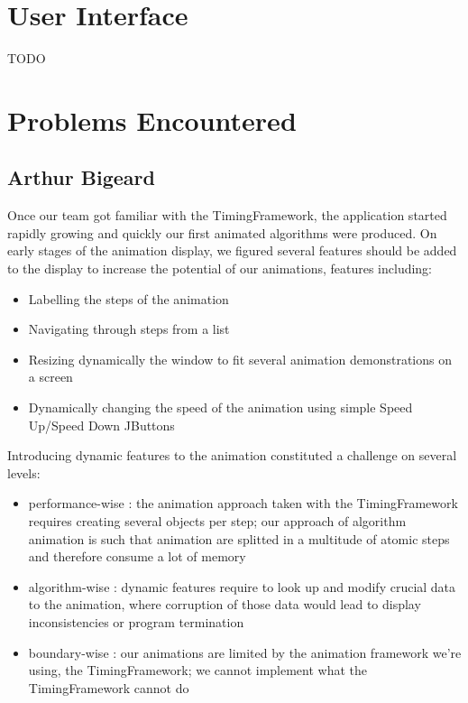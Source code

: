 \documentclass{l3proj}
\begin{document}
\section{User Interface}

TODO

\section{Problems Encountered}
\subsection{Arthur Bigeard}
Once our team got familiar with the TimingFramework, the application started rapidly growing and quickly our first animated algorithms were produced. 
On early stages of the animation display, we figured several features should be added to the display to increase the potential of our animations, features including:
\begin{itemize}
\item Labelling the steps of the animation
\item Navigating through steps from a list
\item Resizing dynamically the window to fit several animation demonstrations on a screen
\item Dynamically changing the speed of the animation using simple Speed Up/Speed Down JButtons
\end{itemize}

Introducing dynamic features to the animation constituted a challenge on several levels:
\begin{itemize}
\item performance-wise : the animation approach taken with the TimingFramework requires creating several objects per step; our approach of algorithm animation is such that animation are splitted
in a multitude of atomic steps and therefore consume a lot of memory
\item algorithm-wise : dynamic features require to look up and modify crucial data to the animation, where corruption of those data would lead to display inconsistencies or program termination
\item boundary-wise : our animations are limited by the animation framework we're using, the TimingFramework; we cannot implement what the TimingFramework cannot do
\end{itemize}
\end{document}
